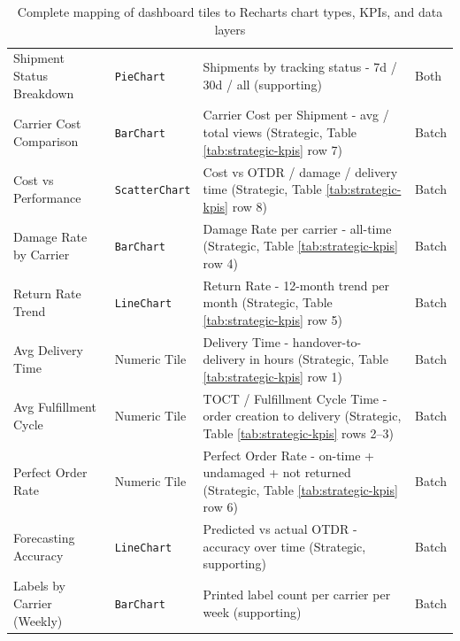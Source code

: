 \documentclass{imc-inf}
\begin{document}
\begin{table}[!htbp]
\begin{tabular}{@{}>{\raggedright\arraybackslash}p{3.5cm}>{\raggedright\arraybackslash}p{2.5cm}p{5.0cm}>{\raggedright\arraybackslash}p{1.5cm}@{}}
    Shipment Status Breakdown   & \texttt{PieChart}       & Shipments by tracking status - 7d / 30d / all (supporting)                                                       & Both           \\[6pt]
    Carrier Cost Comparison     & \texttt{BarChart}       & Carrier Cost per Shipment - avg / total views (Strategic, Table \ref{tab:strategic-kpis} row 7)                  & Batch          \\[6pt]
    Cost vs Performance         & \texttt{ScatterChart}   & Cost vs OTDR / damage / delivery time (Strategic, Table \ref{tab:strategic-kpis} row 8)                          & Batch          \\[6pt]
    Damage Rate by Carrier      & \texttt{BarChart}       & Damage Rate per carrier - all-time (Strategic, Table \ref{tab:strategic-kpis} row 4)                             & Batch          \\[6pt]
    Return Rate Trend           & \texttt{LineChart}      & Return Rate - 12-month trend per month (Strategic, Table \ref{tab:strategic-kpis} row 5)                         & Batch          \\[6pt]
    Avg Delivery Time           & Numeric Tile            & Delivery Time - handover-to-delivery in hours (Strategic, Table \ref{tab:strategic-kpis} row 1)                  & Batch          \\[6pt]
    Avg Fulfillment Cycle       & Numeric Tile            & TOCT / Fulfillment Cycle Time - order creation to delivery (Strategic, Table \ref{tab:strategic-kpis} rows 2--3) & Batch          \\[6pt]
    Perfect Order Rate          & Numeric Tile            & Perfect Order Rate - on-time + undamaged + not returned (Strategic, Table \ref{tab:strategic-kpis} row 6)        & Batch          \\[6pt]
    Forecasting Accuracy        & \texttt{LineChart}      & Predicted vs actual OTDR - accuracy over time (Strategic, supporting)                                            & Batch          \\[6pt]
    Labels by Carrier (Weekly)  & \texttt{BarChart}       & Printed label count per carrier per week (supporting)                                                            & Batch          \\[6pt]
    \bottomrule
  \end{tabular}
  \caption{Complete mapping of dashboard tiles to Recharts chart types, KPIs, and data layers}
  \label{tab:visualization-mapping}
\end{table}
\end{document}
